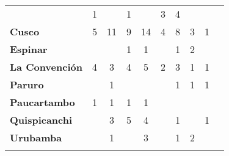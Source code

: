 \begin{tabular}{lccccccccc}
	&1
	&\cellcolor[HTML]{FCC46C} 					&1
	&\cellcolor[HTML]{FCC46C}					&3
	&4											&\cellcolor[HTML]{FCC46C}
	&\cellcolor[HTML]{FCC46C}					&\cellcolor[HTML]{FCC46C}\\
	\textbf{Cusco}                            										
	&5
	&11											&9 	
	&14 										&4
	&8											&3
	&1											&\cellcolor[HTML]{FCC46C}\\
	\textbf{Espinar}       					             									
	&\cellcolor[HTML]{FCC46C} 					&\cellcolor[HTML]{FCC46C}
	&1											&1
	&\cellcolor[HTML]{FCC46C}					&1
	&2											&\cellcolor[HTML]{FCC46C}	
	&\cellcolor[HTML]{FCC46C}\\
	\textbf{La Convención}                      					
	&4 											&3
	&4											&5
	&2											&3
	&1 											&1 
	&\cellcolor[HTML]{FCC46C}\\
	\textbf{Paruro}                            
    &\cellcolor[HTML]{FCC46C}					
	&1
	&\cellcolor[HTML]{FCC46C}					&\cellcolor[HTML]{FCC46C}
	&\cellcolor[HTML]{FCC46C} 					&1
	&1											&1
	&\cellcolor[HTML]{FCC46C}\\
	\textbf{Paucartambo}               		                       					
	&1
	&1											&1		
	&1											&\cellcolor[HTML]{FCC46C}
	&\cellcolor[HTML]{FCC46C}
	&\cellcolor[HTML]{FCC46C}					&\cellcolor[HTML]{FCC46C}
	&\cellcolor[HTML]{FCC46C}\\
	\textbf{Quispicanchi}                                         	                  		
	&\cellcolor[HTML]{FCC46C}
	&3											&5
	&4											&\cellcolor[HTML]{FCC46C}
	&1											&\cellcolor[HTML]{FCC46C}
	&1											&\cellcolor[HTML]{FCC46C}\\
	\textbf{Urubamba}                                                          				
	&\cellcolor[HTML]{FCC46C}					&1
	&\cellcolor[HTML]{FCC46C}					&3
	&\cellcolor[HTML]{FCC46C}					&1
	&2											&\cellcolor[HTML]{FCC46C}
	&\cellcolor[HTML]{FCC46C}\\	
	&\multicolumn{1}{l}{}                       &\multicolumn{1}{l}{}            &\multicolumn{1}{l}{}                         
	&\multicolumn{1}{l}{}                       &\multicolumn{1}{l}{}            &\multicolumn{1}{l}{}                       &\multicolumn{1}{l}{}                       &\multicolumn{1}{l}{}            &\multicolumn{1}{l}{}    
\end{tabular}